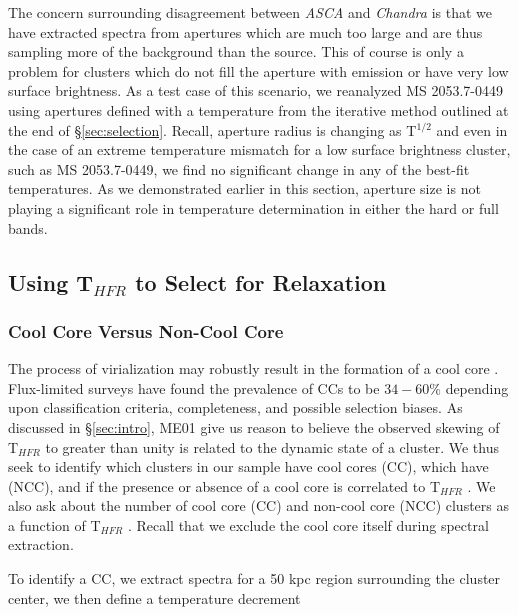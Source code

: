 \documentclass{emulateapj}
\newcommand{\tf}{T$_{HFR}$ }
\newcommand{\chan}{{\textit{Chandra }}}
\newcommand{\asca}{{\textit{ASCA }}}
\begin{document}
The concern surrounding disagreement between \asca and \chan is that
we have extracted spectra from apertures which are much too large and
are thus sampling more of the background than the source. This of
course is only a problem for clusters which do not fill the aperture
with emission or have very low surface brightness. As a test case of this
scenario, we reanalyzed MS 2053.7-0449 using apertures defined with a
temperature from the iterative method outlined at the end of
\S\ref{sec:selection}. Recall, aperture radius is changing as
T$^{1/2}$ and even in the case of an extreme temperature mismatch for
a low surface brightness cluster, such as MS 2053.7-0449, we find no
significant change in any of the best-fit temperatures. As we
demonstrated earlier in this section, aperture size is not playing a
significant role in temperature determination in either the hard or full
bands.

\subsection{Using \tf to Select for Relaxation} \label{sec:relax}

\subsubsection{Cool Core Versus Non-Cool Core}\label{sec:ccncc}

The process of virialization may robustly result in the formation of a
cool core \citep{2006ApJ...640..673O}. Flux-limited surveys have found
the prevalence of CCs to be $34-60\%$ \citep{1997MNRAS.292..419W,
1998MNRAS.298..416P, 2005MNRAS.359.1481B, 2007A&A...466..805C}
depending upon classification criteria, completeness, and possible
selection biases. As discussed in \S\ref{sec:intro}, ME01 give us
reason to believe the observed skewing of \tf to greater than unity is
related to the dynamic state of a cluster. We thus seek to identify
which clusters in our sample have cool cores (CC), which have (NCC),
and if the presence or absence of a cool core is correlated to \tf. We
also ask about the number of cool core (CC) and non-cool core (NCC)
clusters as a function of \tf. Recall that we exclude the cool core
itself during spectral extraction.

To identify a CC, we extract spectra for a 50 kpc region
surrounding the cluster center, we then define a temperature
decrement 
\end{document}
